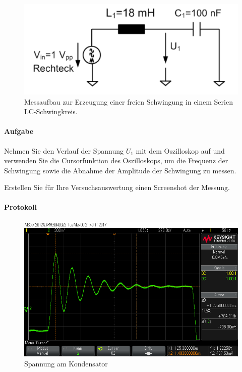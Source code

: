 \documentclass[10pt]{scrreprt}
\begin{document}
        \begin{center}
            \begin{figure}[H]
                \includegraphics[width=\textwidth]{Abbildung16.png}
                \caption{Messaufbau zur Erzeugung einer freien Schwingung in einem Serien LC-Schwingkreis.}
                \label{fig:abb16}
            \end{figure}
        \end{center}

        \paragraph{Aufgabe}
        Nehmen Sie den Verlauf der Spannung $U_1$ mit dem Oszilloskop auf und verwenden
        Sie die Cursorfunktion des Oszilloskops, um die Frequenz der Schwingung
        sowie die Abnahme der Amplitude der Schwingung zu messen.

        \vspace{0.5cm}

        Erstellen Sie für Ihre Versuchsauswertung einen Screenshot der Messung.

        \paragraph{Protokoll}
        \begin{center}
            \begin{figure}[H]
                \includegraphics[width=\textwidth]{scope_12.png}
                \caption{Spannung am Kondensator}
            \end{figure}
        \end{center}
\end{document}
